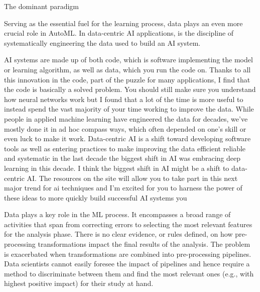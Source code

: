 The dominant paradigm 

Serving as the essential fuel for the learning process, data plays an even more crucial role in AutoML.
In data-centric AI applications, is the discipline of systematically engineering the data used to build an AI system.


AI systems are made up of both code, which is software implementing the model or learning algorithm, as well as data, which you run the code on.
Thanks to all this innovation in the code, part of the puzzle for many applications, I find that the code is basically a solved problem.
You should still make sure you understand how neural networks work but I found that a lot of the time is more useful to instead spend the vast majority of your time working to improve the data.
While people in applied machine learning have engineered the data for decades, we've mostly done it in ad hoc compass ways, which often depended on one's skill or even luck to make it work.
Data-centric AI is a shift toward developing software tools as well as entering practices to make improving the data efficient reliable and systematic in the last decade the biggest shift in AI was embracing deep learning in this decade.
I think the biggest shift in AI might be a shift to data-centric AI.
The resources on the site will allow you to take part in this next major trend for ai techniques and I'm excited for you to harness the power of these ideas to more quickly build successful AI systems you

Data plays a key role in the ML process.
It encompasses a broad range of activities that span from correcting errors to selecting the most relevant features for the analysis phase.
There is no clear evidence, or rules defined, on how pre-processing transformations impact the final results of the analysis.
The problem is exacerbated when transformations are combined into pre-processing pipelines.
Data scientists cannot easily foresee the impact of pipelines and hence require a method to discriminate between them and find the most relevant ones  (e.g., with highest positive impact) for their study at hand.

